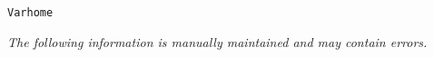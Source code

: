 \label{pkg:varhome}
\begin{verbatim}
Varhome
\end{verbatim}
{\tiny\it The following information is manually maintained and may contain errors.}

